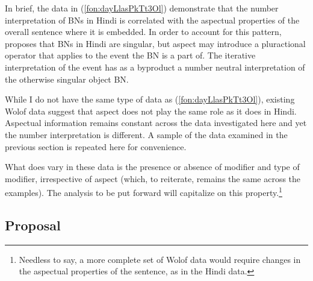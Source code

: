 \documentclass[output=paper]{langscibook}
\begin{document}
In brief, the data in (\ref{fon:dayLlasPkTt3Ol}) demonstrate that the number interpretation of BNs in Hindi is correlated with the aspectual properties of the overall sentence where it is embedded. In order to account for this pattern, \citeauthor{dayal2011hindi} proposes that BNs in Hindi are singular, but aspect may introduce a pluractional operator that applies to the event the BN is a part of. The iterative interpretation of the event has as a byproduct a number neutral interpretation of the otherwise singular object BN.

While I do not have the same type of data as (\ref{fon:dayLlasPkTt3Ol}), existing Wolof data suggest that aspect does not play the same role as it does in Hindi. Aspectual information remains constant across the data investigated here and yet the number interpretation is different. A sample of the data examined in the previous section is repeated here for convenience.
		
		\ea
			\z
		\z
		
\noindent   What does vary in these data is the presence or absence of modifier and type of modifier, irrespective of aspect (which, to reiterate, remains the same across the examples). The analysis to be put forward will capitalize on this property.\footnote{Needless to say, a more complete set of Wolof data would require changes in the aspectual properties of the sentence, as in the Hindi data.}
	
\subsection{Proposal}
\end{document}
